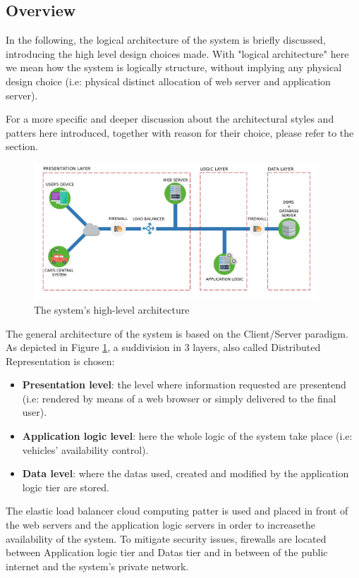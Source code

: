 \subsection{Overview}

In the following, the logical architecture of the system is briefly discussed, introducing the high level design choices made.
With "logical architecture" here we mean how the system is logically structure, without implying any physical design choice (i.e: physical distinct allocation of web server and application server).

For a more specific and deeper discussion about the architectural styles and patters here introduced, together with reason for their choice, please refer to the  section.

\begin{figure}[h]
	\centerline{
		\includegraphics[width=400px]{../Datas/images/PEhla.pdf}
	}
		\caption{The system's high-level architecture}
		\label{fig:high-lev-arch}
\end{figure}

The general architecture of the system is based on the Client/Server paradigm. As depicted in Figure \ref{fig:high-lev-arch}, a suddivision in 3 layers, also called Distributed Representation is chosen:

\begin{itemize}
	\item \textbf{Presentation level}: the level where information requested are presentend (i.e: rendered by means of a web browser or simply delivered to the final user).
	\item \textbf{Application logic level}: here the whole logic of the system take place (i.e: vehicles' availability control).
	\item \textbf{Data level}: where the datas used, created and modified by the application logic tier are stored.
\end{itemize}

The elastic load balancer cloud computing patter is used and placed in front of the web servers and the application logic servers in order to increasethe availability of the system.
To mitigate security issues, firewalls are located between Application logic tier and Datas tier and in between of the public internet and the system's private network.
